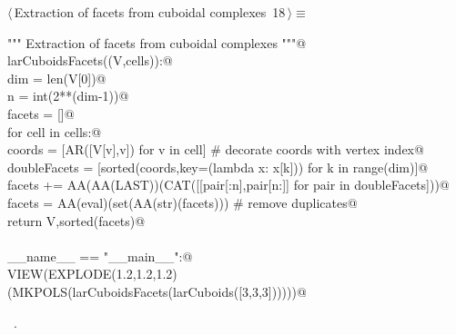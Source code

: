 \documentclass[11pt,oneside]{article}	%
\begin{document}
\begin{flushleft} \small \label{scrap25}
\protect{}$\langle\,$Extraction of facets from cuboidal complexes\nobreak\ {\footnotesize 18}$\,\rangle\equiv$
\vspace{-1ex}
\begin{list}{}{} \item
\mbox{}\verb@""" Extraction of facets from cuboidal complexes """@\\
\mbox{}\verb@def larCuboidsFacets((V,cells)):@\\
\mbox{}\verb@   dim = len(V[0])@\\
\mbox{}\verb@   n = int(2**(dim-1))@\\
\mbox{}\verb@   facets = []@\\
\mbox{}\verb@   for cell in cells:@\\
\mbox{}\verb@      coords = [AR([V[v],v]) for v in cell] # decorate coords with vertex index@\\
\mbox{}\verb@      doubleFacets = [sorted(coords,key=(lambda x: x[k])) for k in range(dim)]@\\
\mbox{}\verb@      facets += AA(AA(LAST))(CAT([[pair[:n],pair[n:]] for pair in doubleFacets]))@\\
\mbox{}\verb@   facets = AA(eval)(set(AA(str)(facets))) # remove duplicates@\\
\mbox{}\verb@   return V,sorted(facets)@\\
\mbox{}\verb@@\\
\mbox{}\verb@if __name__ == "__main__":@\\
\mbox{}\verb@   VIEW(EXPLODE(1.2,1.2,1.2)(MKPOLS(larCuboidsFacets(larCuboids([3,3,3])))))@\\
\mbox{}\verb@@{\NWsep}
\end{list}
\vspace{-1ex}
\footnotesize\addtolength{\baselineskip}{-1ex}
\begin{list}{}{\setlength{\itemsep}{-\parsep}\setlength{\itemindent}{-\leftmargin}}
\item \NWtxtMacroRefIn\ .
\end{list}
\end{flushleft}


\end{document}
